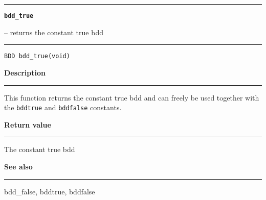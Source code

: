\begin{minipage}{\textwidth}

\noindent\begin{minipage}{\textwidth}
\rule{\textwidth}{0.5mm}
{\tt\bf bdd\_true }
\--- returns the constant true bdd  \hspace{\fill}
\\\rule[1.5ex]{\textwidth}{0.5mm}
\end{minipage}

\noindent\begin{verbatim}
BDD bdd_true(void) 
\end{verbatim}

\vspace{\parsep}\noindent
{\bf Description}\\\rule[1.5ex]{\textwidth}{0.2mm}\vspace{-1.5ex}\setlength{\parindent}{1em}
This function returns the constant true bdd and can freely be
           used together with the {\tt bddtrue} and {\tt bddfalse}
	   constants. 

\setlength{\parindent}{0em}\vspace{\parsep}\vspace{\baselineskip}\noindent
{\bf Return value}\\\rule[1.5ex]{\textwidth}{0.2mm}\vspace{-1.5ex}
The constant true bdd 

\vspace{\parsep}\vspace{\baselineskip}\noindent
{\bf See also}\\\rule[1.5ex]{\textwidth}{0.2mm}\vspace{-1.5ex}
bdd\_false, bddtrue, bddfalse 
\end{minipage}
\vspace{8ex}
